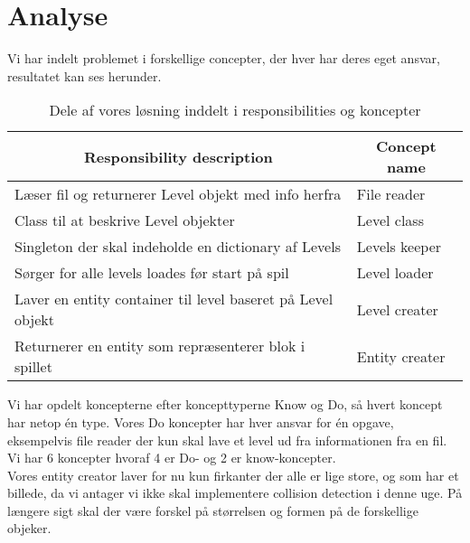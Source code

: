 \section{Analyse}
Vi har indelt problemet i forskellige concepter, der hver har deres eget ansvar, resultatet kan ses herunder.
\begin{table}[]
\centering
\begin{tabular}{|l|l|}
\hline
\multicolumn{1}{|c|}{\textbf{Responsibility description}}            & \multicolumn{1}{c|}{\textbf{Concept name}} \\ \hline
Læser fil og returnerer Level objekt med info herfra        & File reader                       \\ \hline
Class til at beskrive Level objekter                        & Level class                       \\ \hline
Singleton der skal indeholde en dictionary af Levels        & Levels keeper                     \\ \hline
Sørger for alle levels loades før start på spil             & Level loader                      \\ \hline
Laver en entity container til level baseret på Level objekt & Level creater                     \\ \hline
Returnerer en entity som repræsenterer blok i spillet       & Entity creater                    \\ \hline
\end{tabular}
\caption{Dele af vores løsning inddelt i responsibilities og koncepter}
\label{responsibilities}
\end{table}
Vi har opdelt koncepterne efter koncepttyperne Know og Do, så hvert koncept har netop én type. Vores Do koncepter har hver ansvar for én opgave, eksempelvis file reader der kun skal lave et level ud fra informationen fra en fil. Vi har 6 koncepter hvoraf 4 er Do- og 2 er know-koncepter.\\
Vores entity creator laver for nu kun firkanter der alle er lige store, og som har et billede, da vi antager vi ikke skal implementere collision detection i denne uge. På længere sigt skal der være forskel på størrelsen og formen på de forskellige objeker.\\

